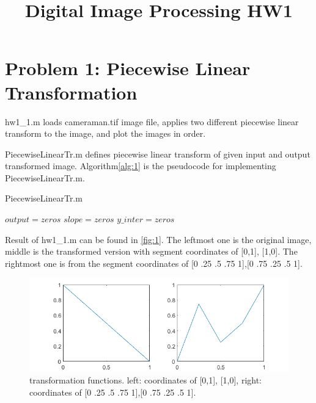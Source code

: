 \documentclass[extendedabs]{bmvc2k}
\begin{document}
\title{Digital Image Processing HW1}

\maketitle
\vspace{-0.2in}

\section*{Problem 1: Piecewise Linear Transformation}
hw1\_1.m loads cameraman.tif image file, applies two different piecewise 
linear transform to the image, and plot the images in order.

PiecewiseLinearTr.m defines piecewise linear transform of given input and 
output transformed image.
Algorithm\ref{alg:1} is the pseudocode for implementing PiecewiseLinearTr.m.

\begin{algorithm}
\caption{PiecewiseLinearTr.m}
\label{alg:1}
$output = zeros$\;
$slope = zeros$\;
$y\_inter = zeros$\;

\end{algorithm}

Result of hw1\_1.m can be found in \figurename{\ref{fig:1}}. The leftmost one is the original image, 
middle is the transformed version with segment coordinates of [0,1], [1,0]. The rightmost one is from the
segment coordinates of [0 .25 .5 .75 1],[0 .75 .25 .5 1].

\begin{figure}[h]
    \centering
    \includegraphics[width=0.8\linewidth]{hw1_1_2}
    \caption{transformation functions. 
    left: coordinates of [0,1], [1,0], right: coordinates of [0 .25 .5 .75 1],[0 .75 .25 .5 1].}
    \label{fig:2}
    \vspace{-2mm}
\end{figure}
\end{document}
